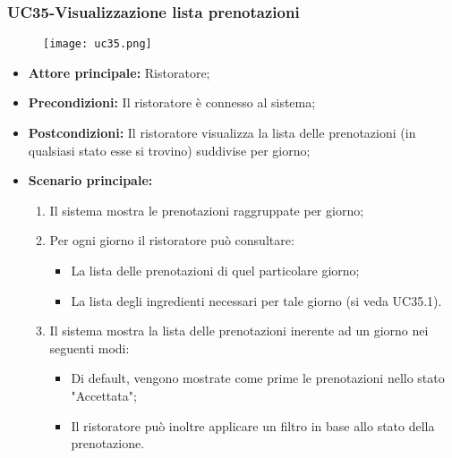 \subsubsection{UC35-Visualizzazione lista prenotazioni}
\begin{figure}[h] \texttt{[image: uc35.png]} \end{figure}
\begin{itemize}
\item \textbf{Attore principale:} Ristoratore;
\item \textbf{Precondizioni:} Il ristoratore è connesso al sistema;
\item \textbf{Postcondizioni:} Il ristoratore visualizza la lista delle prenotazioni (in qualsiasi stato esse si trovino) suddivise per giorno;
\item \textbf{Scenario principale:}
\begin{enumerate}
    \item Il sistema mostra le prenotazioni raggruppate per giorno;
    \item Per ogni giorno il ristoratore può consultare:
    \begin{itemize}
        \item La lista delle prenotazioni di quel particolare giorno;
        \item La lista degli ingredienti necessari per tale giorno (si veda UC35.1).
    \end{itemize}
    \item Il sistema mostra la lista delle prenotazioni inerente ad un giorno nei seguenti modi:
    \begin{itemize}
        \item Di default, vengono mostrate come prime le prenotazioni nello stato "Accettata";
        \item Il ristoratore può inoltre applicare un filtro in base allo stato della prenotazione.
    \end{itemize}
\end{enumerate}
\end{itemize}


